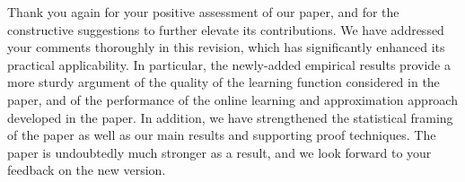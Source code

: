 \documentclass[11pt]{article}
\begin{document}
\vspace{12pt}

Thank you again for your positive assessment of our paper, and for the constructive suggestions to further elevate its contributions. We have addressed your comments thoroughly in this revision, which has significantly enhanced its practical applicability. In particular, the newly-added empirical results provide a more sturdy argument of the quality of the learning function considered in the paper, and of the performance of the online learning and approximation approach developed in the paper. In addition, we have strengthened the statistical framing of the paper as well as our main results and supporting proof techniques. The paper is undoubtedly much stronger as a result, and we look forward to your feedback on the new version.

\newpage
{}


\end{document}
